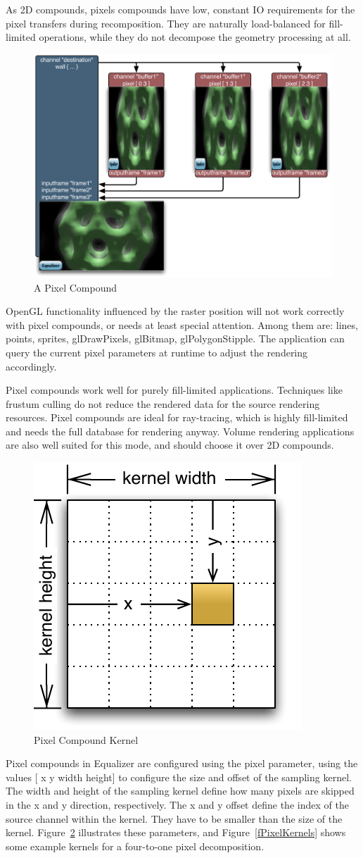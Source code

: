 \documentclass[10pt,a4]{scrartcl}
\newcommand{\fig}[1]{Figure~\ref{#1}}
\begin{document}
As 2D compounds, pixels compounds have low, constant IO requirements for
the pixel transfers during recomposition. They are naturally load-balanced for
fill-limited operations, while they do not decompose the geometry processing at
all.

\begin{figure}
  \includegraphics[width=.618\textwidth]{images/Pixel.pdf}
  {\caption{\label{fPixel}\small A Pixel Compound}}
\end{figure}
OpenGL functionality influenced by the raster position will not work
correctly with pixel compounds, or needs at least special
attention. Among them are: lines, points, sprites, glDrawPixels,
glBitmap, glPolygonStipple. The application can query the current pixel
parameters at runtime to adjust the rendering accordingly.

Pixel compounds work well for purely fill-limited applications.
Techniques like frustum culling do not reduce the rendered data for the
source rendering resources. Pixel compounds are ideal for ray-tracing,
which is highly fill-limited and needs the full database for rendering
anyway. Volume rendering applications are also well suited for this
mode, and should choose it over 2D compounds.

\begin{figure}
  \includegraphics[width=.382\textwidth]{images/pixelKernel.pdf}
  {\caption{\label{fPixelKernel}\small Pixel Compound Kernel}}
\end{figure}
Pixel compounds in Equalizer are configured using the \textsf{pixel}
parameter, using the values \textsf{[ x y width height]}  to configure
the size and offset of the sampling kernel. The width and height of the
sampling kernel define how many pixels are skipped in the x and y
direction, respectively. The x and y offset define the index of the
source channel within the kernel. They have to be smaller than the size
of the kernel. \fig{fPixelKernel} illustrates these parameters, and
\fig{fPixelKernels} shows some example kernels for a four-to-one pixel decomposition.
\end{document}
